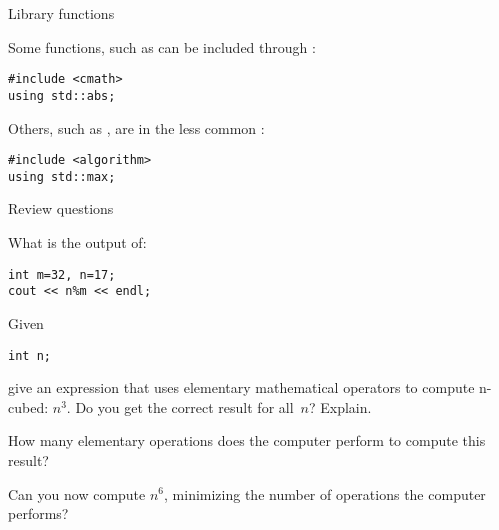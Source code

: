  {Library functions}

Some functions, such as  can be included through :
\begin{lstlisting}
#include <cmath>
using std::abs;
\end{lstlisting}
Others, such as , are in the less common :
\begin{lstlisting}
#include <algorithm>
using std::max;
\end{lstlisting}

 {Review questions}

\begin{exercise}
  \label{ex:cpp-mod}
What is the output of:
\begin{lstlisting}
int m=32, n=17;
cout << n%m << endl;
\end{lstlisting}
\end{exercise}

\begin{exercise}
  \label{ex:cpp-cube}
  Given
\begin{lstlisting}
int n;
\end{lstlisting}
give an expression that
uses elementary mathematical operators to compute n-cubed: $n^3$.
Do you get the correct result for all~$n$? Explain.

How many elementary operations does the computer perform to compute
this result?

Can you now compute $n^6$, minimizing the number of operations the
computer performs?
\end{exercise}
